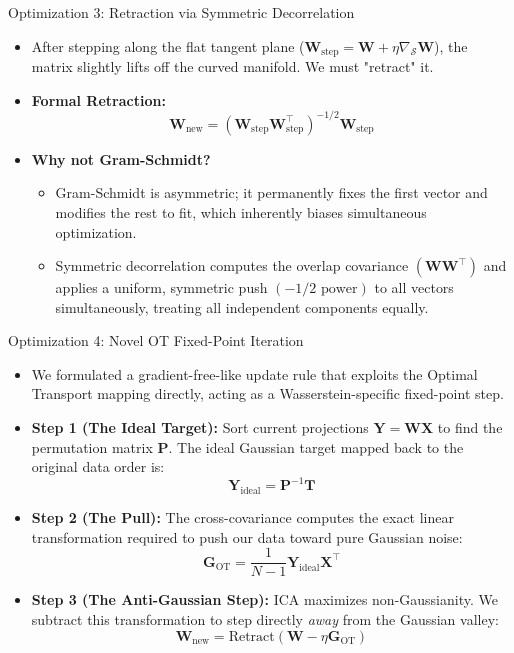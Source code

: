 \documentclass{beamer}
\begin{document}
\begin{frame}{Optimization 3: Retraction via Symmetric Decorrelation}
  \begin{itemize}
    \item After stepping along the flat tangent plane ($\mathbf{W}_{\text{step}} = \mathbf{W} + \eta \nabla_{\mathcal{S}} \mathbf{W}$), the matrix slightly lifts off the curved manifold. We must "retract" it.
    \item \textbf{Formal Retraction:}
      \[
        \mathbf{W}_{\text{new}} = (\mathbf{W}_{\text{step}}\mathbf{W}_{\text{step}}^\top)^{-1/2} \mathbf{W}_{\text{step}}
      \]
    \item \textbf{Why not Gram-Schmidt?} 
      \begin{itemize}
          \item Gram-Schmidt is asymmetric; it permanently fixes the first vector and modifies the rest to fit, which inherently biases simultaneous optimization.
          \item Symmetric decorrelation computes the overlap covariance $(\mathbf{W}\mathbf{W}^\top)$ and applies a uniform, symmetric push $(-1/2 \text{ power})$ to all vectors simultaneously, treating all independent components equally.
      \end{itemize}
  \end{itemize}
\end{frame}

\begin{frame}{Optimization 4: Novel OT Fixed-Point Iteration}
  
  \begin{itemize}
    \item We formulated a gradient-free-like update rule that exploits the Optimal Transport mapping directly, acting as a Wasserstein-specific fixed-point step.
    \item \textbf{Step 1 (The Ideal Target):} Sort current projections $\mathbf{Y} = \mathbf{W}\mathbf{X}$ to find the permutation matrix $\mathbf{P}$. The ideal Gaussian target mapped back to the original data order is:
      \[ \mathbf{Y}_{\text{ideal}} = \mathbf{P}^{-1} \mathbf{T} \]
    \item \textbf{Step 2 (The Pull):} The cross-covariance computes the exact linear transformation required to push our data toward pure Gaussian noise:
      \[ \mathbf{G}_{\text{OT}} = \frac{1}{N-1} \mathbf{Y}_{\text{ideal}} \mathbf{X}^\top \]
    \item \textbf{Step 3 (The Anti-Gaussian Step):} ICA maximizes non-Gaussianity. We subtract this transformation to step directly \textit{away} from the Gaussian valley:
      \[ \mathbf{W}_{\text{new}} = \text{Retract}(\mathbf{W} - \eta \mathbf{G}_{\text{OT}}) \]
  \end{itemize}
\end{frame}
\end{document}
